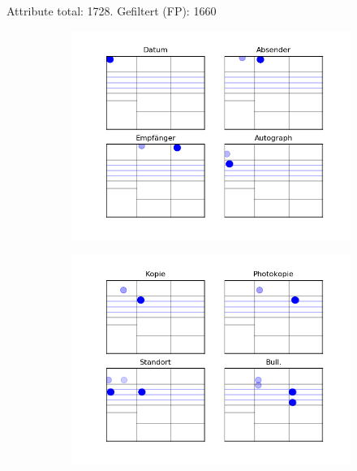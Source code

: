 Attribute total: 1728. Gefiltert (FP): 1660

\begin{figure}[H]
\centering
	\begin{subfigure}[t]{0.243\textwidth}
	\centering
		\includegraphics[scale=0.28]{Bilder/attributes_0.png}
	\end{subfigure}
	\begin{subfigure}[t]{0.243\textwidth}
	\centering
		\includegraphics[scale=0.28]{Bilder/attributes_1.png}
	\end{subfigure}
	\begin{subfigure}[t]{0.243\textwidth}
	\centering

\end{subfigure}
\end{figure}
